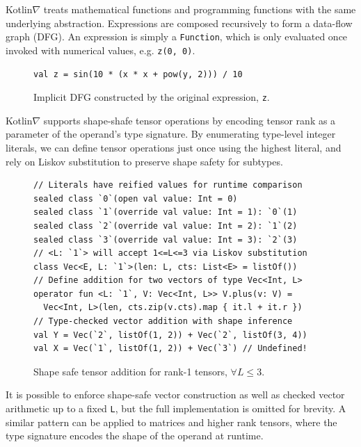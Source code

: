 \documentclass{article}
\begin{document}
Kotlin$\nabla$ treats mathematical functions and programming functions with the same underlying abstraction. Expressions are composed recursively to form a data-flow graph (DFG). An expression is simply a \texttt{Function}, which is only evaluated once invoked with numerical values, e.g. \texttt{z(0, 0)}.

\squeezeup\begin{figure}[!htb]
\centering
\begin{lstlisting}[basicstyle=\ttfamily\small]
 val z = sin(10 * (x * x + pow(y, 2))) / 10
\end{lstlisting}
\squeezeup\centering
{}
\squeezeup\squeezeup\squeezeup\caption{Implicit DFG constructed by the original expression, \texttt{z}.}
\end{figure}

\squeezeup Kotlin$\nabla$ supports shape-shafe tensor operations by encoding tensor rank as a parameter of the operand's type signature. By enumerating type-level integer literals, we can define tensor operations just once using the highest literal, and rely on Liskov substitution to preserve shape safety for subtypes.

\squeezeup\begin{figure}[!htb]
\begin{lstlisting}
// Literals have reified values for runtime comparison
sealed class `0`(open val value: Int = 0)
sealed class `1`(override val value: Int = 1): `0`(1)
sealed class `2`(override val value: Int = 2): `1`(2)
sealed class `3`(override val value: Int = 3): `2`(3)
// <L: `1`> will accept 1<=L<=3 via Liskov substitution
class Vec<E, L: `1`>(len: L, cts: List<E> = listOf())
// Define addition for two vectors of type Vec<Int, L>
operator fun <L: `1`, V: Vec<Int, L>> V.plus(v: V) =
  Vec<Int, L>(len, cts.zip(v.cts).map { it.l + it.r })
// Type-checked vector addition with shape inference
val Y = Vec(`2`, listOf(1, 2)) + Vec(`2`, listOf(3, 4))
val X = Vec(`1`, listOf(1, 2)) + Vec(`3`) // Undefined!
\end{lstlisting}
\caption{Shape safe tensor addition for rank-1 tensors, $\forall L\leq3.$}\squeezeup
\end{figure}
\squeezeup
It is possible to enforce shape-safe vector construction as well as checked vector arithmetic up to a fixed \texttt{L}, but the full implementation is omitted for brevity. A similar pattern can be applied to matrices and higher rank tensors, where the type signature encodes the shape of the operand at runtime.
\end{document}
